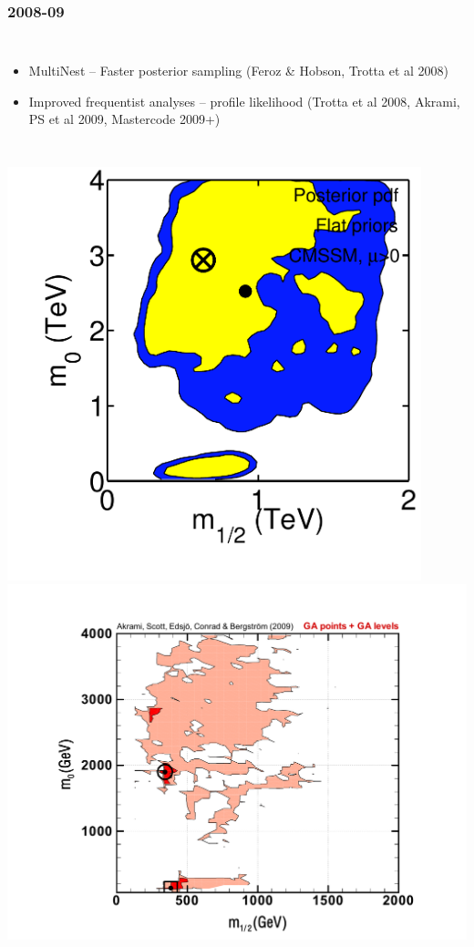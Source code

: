 \documentclass[xcolor=dvipsnames]{beamer}
\begin{document}
\begin{frame}
\frametitle{2008-09}

\begin{columns}

\begin{itemize}
  \item MultiNest -- Faster posterior sampling (Feroz \& Hobson, Trotta et al 2008) 
  \item Improved frequentist analyses -- profile likelihood (Trotta et al 2008, Akrami, PS et al 2009, Mastercode 2009+)
\end{itemize}

\end{columns}

\vspace{2mm}

\begin{columns}
\includegraphics[width=0.9\textwidth]{Trotta08}
\includegraphics[width=1.1\textwidth, trim = 0 0 0 65, clip = true]{GA_m0mhf_GAlevels}
\end{columns}

\end{frame}
\end{document}
